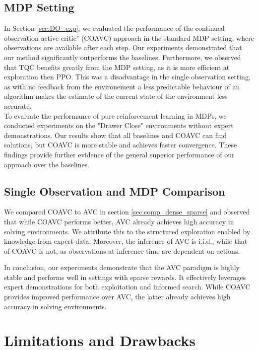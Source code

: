 \subsection{MDP Setting}
In Section \ref{sec:DO_exp}, we evaluated the performance of the continued observation active critic" (COAVC) approach in the standard MDP setting, 
where observations are available after each step. Our experiments demonstrated that our 
method significantly outperforms the baselines. Furthermore, we observed that TQC benefits greatly 
from the MDP setting, as it is more efficient at exploration then PPO. This was a disadvantage in the single observation setting, as with no feedback 
from the environement a less predictable behaviour of an algorithm makes the estimate of the current state of the environment less accurate.\\
To evaluate the performance of pure reinforcement learning in MDPs, we conducted experiments on the "Drawer Close" 
environments without expert demonstrations. Our results show that all baselines and COAVC can find solutions, but COAVC is more stable and achieves 
faster convergence. These findings provide further evidence of the general superior performance of our approach over the baselines. 

\subsection{Single Observation and MDP Comparison}
We compared COAVC to AVC in section \ref{sec:comp_dense_sparse} and observed that while COAVC performs better, 
AVC already achieves high accuracy in solving environments. We attribute this to the structured exploration enabled by knowledge from 
expert data. Moreover, the inference of AVC is i.i.d., while that of COAVC is not, as observations at inference time are dependent on actions. 

In conclusion, our experiments demonstrate that the AVC paradigm is highly stable and performs well in settings with sparse rewards. 
It effectively leverages expert demonstrations for both exploitation and informed search. While COAVC provides improved performance over 
AVC, the latter already achieves high accuracy in solving environments.

\section{Limitations and Drawbacks}
